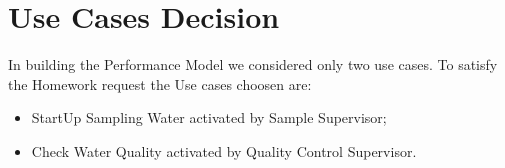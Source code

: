 \newpage \chapter{\textbf{Use Cases Decision}}

In building the Performance Model we considered only two use cases. To satisfy the Homework request the Use cases choosen are:
\begin{itemize}
	\item StartUp Sampling Water activated by Sample Supervisor;
	\item Check Water Quality activated by Quality Control Supervisor.
\end{itemize}
